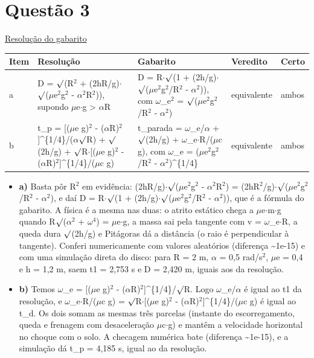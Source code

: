 \documentclass{article}%
\begin{document}
\section*{Questão 3}%
\href{https://poliedroresolve.sistemapoliedro.com.br/vestibulares/ita/2027/ita-2-fase-dia-3-22-10-2026-2-fase-dia-3/dissertativa-3-fisica-2-fase-dia-3-ita-2027}{Resolução do gabarito}\par\smallskip%
\begin{longtable}{@{}p{} p{} p{} p{} p{}@{}}\toprule Item & Resolução & Gabarito & Veredito & Certo \\ \midrule
a & D = $\surd$(R$^2$ + (2hR/g)$\cdot$$\surd$($\mu$e$^2$g$^2$ - $\alpha$$^2$R$^2$)), supondo $\mu$e$\cdot$g > $\alpha$R & D = R$\cdot$$\surd$(1 + (2h/g)$\cdot$$\surd$($\mu$e$^2$g$^2$/R$^2$ - $\alpha$$^2$)), com $\omega$\_e$^2$ = $\surd$($\mu$e$^2$g$^2$/R$^2$ - $\alpha$$^2$) & equivalente & ambos \\
b & t\_p = {[}($\mu$e g)$^2$ - ($\alpha$R)$^2${]}\^{}\{1/4\}/($\alpha$$\surd$R) + $\surd$(2h/g) + $\surd$R$\cdot${[}($\mu$e g)$^2$ - ($\alpha$R)$^2${]}\^{}\{1/4\}/($\mu$c g) & t\_parada = $\omega$\_e/$\alpha$ + $\surd$(2h/g) + $\omega$\_e$\cdot$R/($\mu$c g), com $\omega$\_e = ($\mu$e$^2$g$^2$/R$^2$ - $\alpha$$^2$)\^{}\{1/4\} & equivalente & ambos \\
\bottomrule\end{longtable}%
\begin{itemize}%
\item%
\textbf{a)} Basta pôr R$^2$ em evidência: (2hR/g)$\cdot$$\surd$($\mu$e$^2$g$^2$ - $\alpha$$^2$R$^2$) = (2hR$^2$/g)$\cdot$$\surd$($\mu$e$^2$g$^2$/R$^2$ - $\alpha$$^2$), e daí D = R$\cdot$$\surd$(1 + (2h/g)$\cdot$$\surd$($\mu$e$^2$g$^2$/R$^2$ - $\alpha$$^2$)), que é a fórmula do gabarito. A física é a mesma nas duas: o atrito estático chega a $\mu$e$\cdot$m$\cdot$g quando R$\surd$($\alpha$$^2$ + $\omega$$^{4}$) = $\mu$e$\cdot$g, a massa sai pela tangente com v = $\omega$\_e$\cdot$R, a queda dura $\surd$(2h/g) e Pitágoras dá a distância (o raio é perpendicular à tangente). Conferi numericamente com valores aleatórios (diferença \textasciitilde{}1e{-}15) e com uma simulação direta do disco: para R = 2 m, $\alpha$ = 0,5 rad/s$^2$, $\mu$e = 0,4 e h = 1,2 m, saem t1 = 2,753 s e D = 2,420 m, iguais aos da resolução.%
\item%
\textbf{b)} Temos $\omega$\_e = {[}($\mu$e g)$^2$ - ($\alpha$R)$^2${]}\^{}\{1/4\}/$\surd$R. Logo $\omega$\_e/$\alpha$ é igual ao t1 da resolução, e $\omega$\_e$\cdot$R/($\mu$c g) = $\surd$R$\cdot${[}($\mu$e g)$^2$ - ($\alpha$R)$^2${]}\^{}\{1/4\}/($\mu$c g) é igual ao t\_d. Os dois somam as mesmas três parcelas (instante do escorregamento, queda e frenagem com desaceleração $\mu$c$\cdot$g) e mantêm a velocidade horizontal no choque com o solo. A checagem numérica bate (diferença \textasciitilde{}1e{-}15), e a simulação dá t\_p = 4,185 s, igual ao da resolução.%
\end{itemize}%
\end{document}
